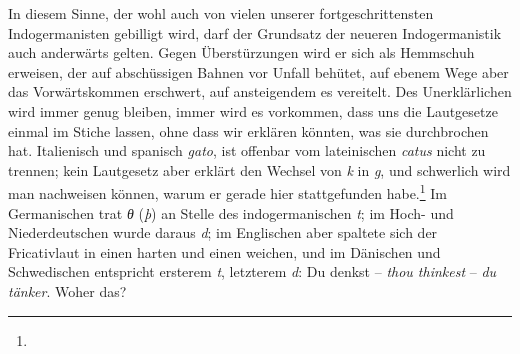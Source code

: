 {In diesem Sinne, der wohl auch von vielen unserer fortgeschrittensten Indogermanisten gebilligt wird, darf der Grundsatz der neueren Indogermanistik auch anderwärts gelten. Gegen Überstürzungen wird er sich als Hemmschuh erweisen, der auf abschüssigen Bahnen vor Unfall behütet, auf ebenem Wege aber das Vorwärtskommen erschwert, auf ansteigendem es vereitelt.  Des Unerklärlichen wird immer genug bleiben, immer wird es vorkommen, dass uns die Lautgesetze einmal im Stiche lassen, ohne dass wir er\label{sp.190}klären könnten, was sie durchbrochen hat. Italienisch und spanisch \textit{gato},  ist offenbar vom lateinischen \textit{catus} nicht zu trennen; kein Lautgesetz aber erklärt den Wechsel von \textit{k} in \textit{g}, und schwerlich wird man nachweisen können, warum er gerade hier stattgefunden habe.\footnote{} Im Germanischen trat \textit{θ} (\textit{þ}) an Stelle des indogermanischen \textit{t}; im Hoch- und Niederdeutschen wurde daraus \textit{d}; im Englischen aber spaltete sich der Fricativlaut in einen harten und einen weichen, und im Dänischen und Schwedischen entspricht ersterem \textit{t}, letzterem \textit{d}: Du denkst – \textit{thou thinkest} – \textit{du tänker}. Woher das?

}
